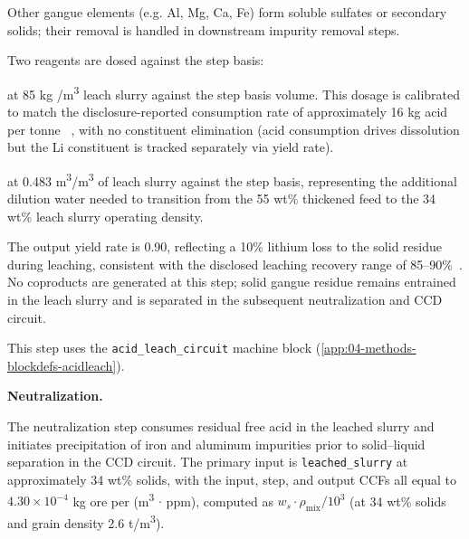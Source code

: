 Other gangue elements (e.g. Al, Mg, Ca, Fe) form soluble sulfates or secondary solids; their removal is handled in downstream impurity removal steps.  

Two reagents are dosed against the step basis:
\begin{description}[noitemsep, topsep=0pt]
\item[\textbullet\enskip Sulfuric acid] at 85 kg /m\textsuperscript{3} leach slurry against the step basis volume. This dosage is calibrated to match the disclosure-reported consumption rate of approximately 16 kg acid per tonne ~\cite{sgscanadaincSK1300Technical2024, rothFeasibilityStudyNational2022}, with no constituent elimination (acid consumption drives dissolution but the Li constituent is tracked separately via yield rate).
\item[\textbullet\enskip Process water] at 0.483 m\textsuperscript{3}/m\textsuperscript{3} of leach slurry against the step basis, representing the additional dilution water needed to transition from the 55 wt\% thickened feed to the 34 wt\% leach slurry operating density.
\end{description}
The output yield rate is 0.90, reflecting a 10\% lithium loss to the solid residue during leaching, consistent with the disclosed leaching recovery range of 85--90\%~\cite{sgscanadaincSK1300Technical2024}. No coproducts are generated at this step; solid gangue residue remains entrained in the leach slurry and is separated in the subsequent neutralization and CCD circuit.

This step uses the \texttt{acid\_leach\_circuit} machine block (\ref{app:04-methods-blockdefs-acidleach}).

\medskip
\noindent\textbf{Neutralization.}\quad

The neutralization step consumes residual free acid in the leached slurry and initiates precipitation of iron and aluminum impurities prior to solid--liquid separation in the CCD circuit. The primary input is \texttt{leached\_slurry} at approximately 34 wt\% solids, with the input, step, and output CCFs all equal to $4.30 \times 10^{-4}$ kg ore per (m\textsuperscript{3} $\cdot$ ppm), computed as $w_s \cdot \rho_{\text{mix}} / 10^3$ (at 34 wt\% solids and grain density 2.6 t/m\textsuperscript{3}). 

